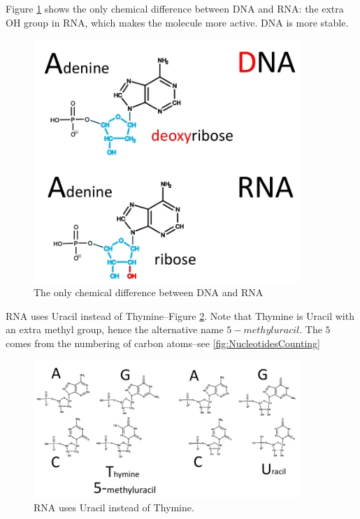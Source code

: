 \documentclass[]{article}
\begin{document}
Figure \ref{fig:NucleotideDNARNA} shows the only chemical difference between DNA and RNA: the extra OH group in RNA, which makes the molecule more active. DNA is more stable.
\begin{figure}[H]
	\caption{The only chemical difference between DNA and RNA }\label{fig:NucleotideDNARNA} 
	\includegraphics[width=0.9\textwidth]{NucleotideDNARNA}
\end{figure}

RNA uses Uracil instead of Thymine--Figure \ref{fig:NucleotideDNARNAThymineUracil}. Note that Thymine is Uracil with an extra methyl group, hence the alternative name $5-methyluracil$. The $5$ comes from the numbering of carbon atoms--see \ref{fig:NucleotidesCounting}
	
\begin{figure}[H]
	\caption{RNA uses Uracil instead of Thymine.} \label{fig:NucleotideDNARNAThymineUracil} 
	\includegraphics[width=0.9\textwidth]{NucleotideDNARNAThymineUracil}
\end{figure}
\end{document}
